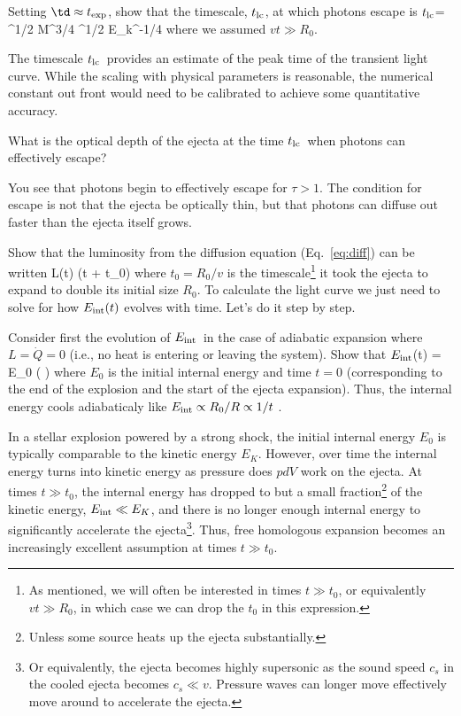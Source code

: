 \documentclass{tufte-handout}
\newcommand{\Eint}{\ensuremath{E_{\rm int}}}
\newcommand{\tlc}{\ensuremath{t_{\rm lc}}}
\begin{document}
 Setting $\td \approx t_{\rm exp}$, show that  the timescale, \tlc, at which 
photons escape is
\beq
\tlc =
^{1/2}
\propto M^{3/4} \kappa^{1/2} E_k^{-1/4}
\eeq
where we assumed $vt \gg R_0$. 


\comment The timescale \tlc\ provides an estimate of the peak time of the transient 
light curve. While the scaling with physical parameters is reasonable, the numerical constant out front would need to be calibrated to achieve some quantitative accuracy. 

 What is the optical depth of the ejecta at the time \tlc\ when
photons can effectively escape?

\comment You see that photons begin to effectively escape for  $\tau > 1$. The condition for escape is not that the ejecta be optically thin, but that photons can diffuse out faster than the ejecta itself grows.

 Show that the luminosity from the diffusion equation (Eq.~\ref{eq:diff}) can 
be written
\beq
L(t) \approx \frac{\Eint(t) }{\tlc^2}  (t + t_0)
\eeq
where $t_0 = R_0/v$ is the timescale\footnote{As mentioned, we will often be interested in times $t \gg t_0$, or equivalently $v t \gg R_0$, in which case we
can drop the $t_0$ in this expression.} it took the ejecta to expand to double its initial size $R_0$. To calculate the light curve  we just need to solve for how 
$\Eint(t)$ evolves with time. Let's do it step by step.

  Consider first the evolution of \Eint\ in the case of adiabatic expansion where 
$L = \dot{Q} = 0$
(i.e., no heat is entering or leaving the system). Show that
\beq
\Eint(t) = E_0 \left(   \right) 
\eeq
where $E_0$ is the initial internal energy and time $t = 0$ (corresponding to the end of the explosion and the start of the ejecta expansion).  Thus, the internal
energy cools adiabaticaly like
$\Eint \propto R_0/R \propto 1/t$ .

\comment In a stellar explosion powered by a strong shock, the initial internal energy $E_0$ is
typically comparable to the kinetic energy $E_K$.  However, over time the internal energy turns
 into kinetic energy as  pressure does $p dV$ work on the ejecta.  At times $t \gg t_0$, the internal energy has dropped to but a small fraction\footnote{Unless some source heats up the ejecta substantially.} of the kinetic energy, $\Eint \ll E_K$, and there is no longer enough internal energy to significantly accelerate the ejecta\footnote{Or equivalently, the ejecta becomes highly supersonic as the sound speed $c_s$ in the cooled ejecta becomes $c_s \ll v$. Pressure waves can longer move effectively move around to accelerate the ejecta.}. Thus, free homologous expansion becomes an increasingly excellent assumption
 at times $t \gg t_0$.
\end{document}
